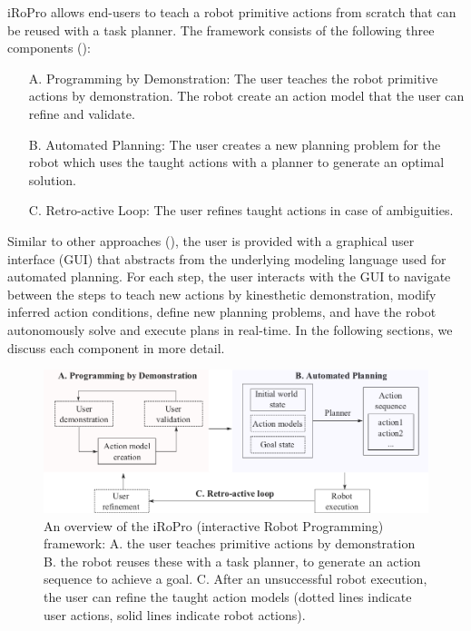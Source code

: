 iRoPro allows end-users to teach a robot primitive actions from scratch that can be reused with a task planner.
The framework consists of the following three components (): 
\begin{enumerate}
	\item[A.]{Programming by Demonstration: The user teaches the robot primitive actions by demonstration. The robot create an action model that the user can refine and validate.}
	\item[B.]{Automated Planning: The user creates a new planning problem for the robot which uses the taught actions with a planner to generate an optimal solution.}
	\item[C.]{Retro-active Loop: The user refines taught actions in case of ambiguities.}
\end{enumerate}
Similar to other approaches (\cite{perzylo2016intuitive}), the user is provided with a graphical user interface (GUI) that abstracts from the underlying modeling language used for automated planning.
For each step, the user interacts with the GUI to navigate between the steps to teach new actions by kinesthetic demonstration, modify inferred action conditions, define new planning problems, and have the robot autonomously solve and execute plans in real-time.
In the following sections, we discuss each component in more detail. 

\begin{figure}[!h]
	\centering
	\includegraphics[width=\linewidth]{figures/framework.png}
	\caption{An overview of the iRoPro (interactive Robot Programming) framework: A. the user teaches primitive actions by demonstration B. the robot reuses these with a task planner, to generate an action sequence to achieve a goal.
	C. After an unsuccessful robot execution, the user can refine the taught action models (dotted lines indicate user actions, solid lines indicate robot actions).}
	\label{fig:framework}
\end{figure}

